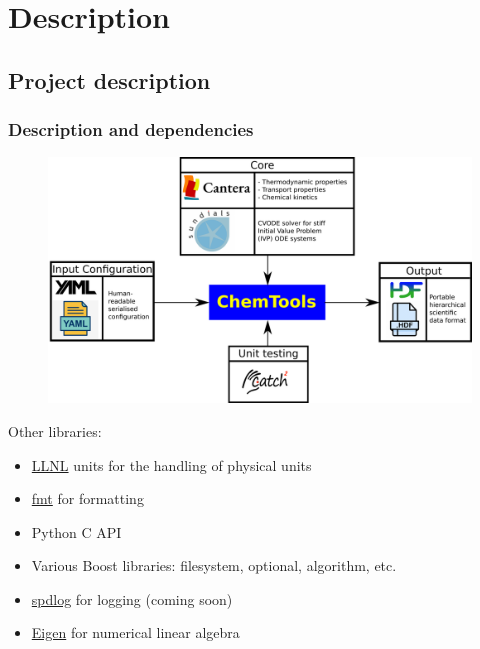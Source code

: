 \documentclass{beamer}
\begin{document}
\section{Description}
\subsection{Project description}
\begin{frame}
\frametitle{Description and dependencies}
\begin{figure}
  \centering
  \includegraphics[width=0.8\linewidth]{figures/svg/ChemTools.png}
\end{figure}
\begin{tiny}
Other libraries:
\begin{itemize}
  \item \href{https://github.com/LLNL/units}{LLNL} units for the handling of physical units
  \item \href{https://github.com/fmtlib/fmt}{fmt} for formatting
  \item Python C API
  \item Various Boost libraries: filesystem, optional, algorithm, etc.
  \item \href{https://github.com/gabime/spdlog}{spdlog} for logging (coming soon)
  \item \href{https://gitlab.com/libeigen/eigen}{Eigen} for numerical linear algebra
\end{itemize}
\end{tiny}
\end{frame}
\end{document}
